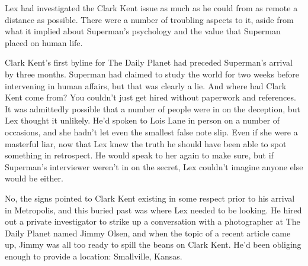 Lex had investigated the Clark Kent issue as much as he could from as
remote a distance as possible. There were a number of troubling aspects
to it, aside from what it implied about Superman's psychology and the
value that Superman placed on human life.

Clark Kent's first byline for The Daily Planet had preceded Superman's
arrival by three months. Superman had claimed to study the world for two
weeks before intervening in human affairs, but that was clearly a lie.
And where had Clark Kent come from? You couldn't just get hired without
paperwork and references. It was admittedly possible that a number of
people were in on the deception, but Lex thought it unlikely. He'd
spoken to Lois Lane in person on a number of occasions, and she hadn't
let even the smallest false note slip. Even if she were a masterful
liar, now that Lex knew the truth he should have been able to spot
something in retrospect. He would speak to her again to make sure, but
if Superman's interviewer weren't in on the secret, Lex couldn't imagine
anyone else would be either.

No, the signs pointed to Clark Kent existing in some respect prior to
his arrival in Metropolis, and this buried past was where Lex needed to
be looking. He hired out a private investigator to strike up a
conversation with a photographer at The Daily Planet named Jimmy Olsen,
and when the topic of a recent article came up, Jimmy was all too ready
to spill the beans on Clark Kent. He'd been obliging enough to provide a
location: Smallville, Kansas.
